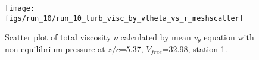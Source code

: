 \begin{figure}[H]
\centering
\texttt{[image: figs/run\_10/run\_10\_turb\_visc\_by\_vtheta\_vs\_r\_meshscatter]}
\caption{Scatter plot of total viscosity $\nu$ calculated by mean $\bar{v}_{\theta}$ equation with non-equilibrium pressure at $z/c$=5.37, $V_{free}$=32.98, station 1.}
\label{fig:run_10_turb_visc_by_vtheta_vs_r_meshscatter}
\end{figure}


